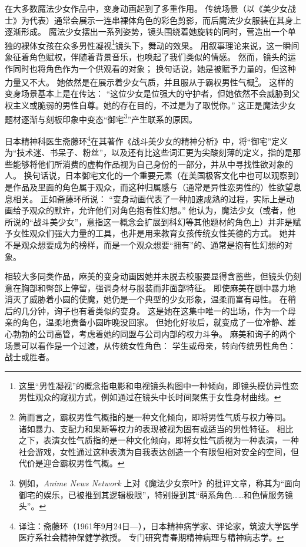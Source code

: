 在大多数魔法少女作品中，变身动画起到了多重作用。
传统场景（以《美少女战士》为代表）通常会展示一连串裸体角色的彩色剪影，而后魔法少女服装在其身上逐渐形成。
魔法少女摆出一系列姿势，镜头围绕着她旋转的同时，营造出一个单独的裸体女孩在众多男性凝视\footnote{%
    这里“男性凝视”的概念指电影和电视镜头构图中一种倾向，即镜头模仿异性恋男性观众的窥视方式，例如通过在镜头中长时间聚焦于女性身材曲线。
}镜头\cite{ref21}下，舞动的效果。
用叙事理论来说，这一瞬间象征着角色赋权，伴随着背景音乐，也唤起了我们类似的情感。
然而，镜头的运作同时也将角色作为一个供观看的对象；
换句话说，她是被赋予力量的，但这种力量又不大。
她依然是在展示着少女气质，并且服从于霸权男性气概\footnote{%
    简而言之，霸权男性气概指的是一种文化倾向，即将男性气质与权力等同。
    诸如暴力、支配力和果断等权力的表现被视为固有或适当的男性特征。
    相比之下，表演女性气质指的是一种文化倾向，即将女性气质视为一种表演，一种社会游戏，女性通过这种表演为自我表达创造一个有限但相对安全的空间，但代价是迎合霸权男性气概。
}\cite{ref22}。
这样的变身场景基本上是在传达：
“这位少女是位强大的守护者，但她依然不会威胁到父权主义或脆弱的男性自尊。她的存在目的，不过是为了取悦你。”
这正是魔法少女题材逐渐与刻板印象中变态“御宅\footnote{%
    例如，\emph{Anime News Network} 上对《魔法少女奈叶》的批评文章，称其为“面向御宅的娱乐，已被推到其逻辑极限”，特别提到其“萌系角色……和色情服务镜头”。
}”产生联系的原因\cite{ref23}。

日本精神科医生斋藤环\footnote{%
    译注：斋藤环（1961年9月24日—），日本精神病学家、评论家，筑波大学医学医疗系社会精神保健学教授。
    专门研究青春期精神病理与精神病志学。
}在其著作《战斗美少女的精神分析》中，将“御宅”定义为“技术迷、书呆子、粉丝”，以及还有比这些词汇更为尖酸刻薄的定义，指的是那些能够将他们所消费的虚构作品视为自己身份的一部分，并从中寻找性欲对象的人。
换句话说，日本御宅文化的一个重要元素（在美国极客文化中也可以观察到）是作品及里面的角色属于观众，而这种归属感与（通常是异性恋男性的）性欲望息息相关。
正如斋藤环所说：
“变身动画代表了一种加速成熟的过程，实际上是动画给予观众的默许，允许他们对角色抱有性幻想。”
他认为，魔法少女（或者，他所说的“战斗美少女”，意指这一概念会扩展到科幻等其他题材的角色上）并非是赋予女性观众们强大力量的工具，也非是用来教育女孩传统女性美德的方式。
她并不是观众想要成为的榜样，而是一个观众想要“拥有”的、通常是抱有性幻想的对象\cite{ref19}。

相较大多同类作品，麻美的变身动画因她并未脱去校服要显得含蓄些，但镜头仍刻意在胸部和臀部上停留，强调身材与服装而非面部特征。
即使麻美在剧中暴力地消灭了威胁着小圆的使魔，她仍是一个典型的少女形象，温柔而富有母性。
在稍后的几分钟，询子也有着类似的变身。
这是她在这集中唯一的出场，作为一个母亲的角色，温柔地责备小圆昨晚没回家。
但她化好妆后，就变成了一位冷静、雄心勃勃的公司高管，考虑着她的同盟与公司内部的权力斗争。
麻美和询子的两个场景可以看作是一个过渡，从传统女性角色：
学生或母亲，转向传统男性角色：
战士或胜者。

